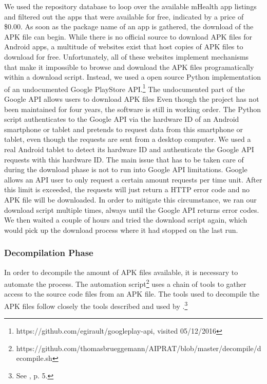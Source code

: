 We used the repository database to loop over the available mHealth app listings and filtered out the apps that were available for free, indicated by a price of \$0.00.
As soon as the package name of an app is gathered, the download of the APK file can begin. 
While there is no official source to download APK files for Android apps, a multitude of websites exist that host copies of APK files to download for free.
Unfortunately, all of these websites implement mechanisms that make it impossible to browse and download the APK files programatically within a download script.
Instead, we used a open source Python implementation of an undocumented Google PlayStore API.\footnote{https://github.com/egirault/googleplay-api, visited 05/12/2016} 
The undocumented part of the Google API allows users to download APK files 
Even though the project has not been maintained for four years, the software is still in working order.
The Python script authenticates to the Google API via the hardware ID of an Android smartphone or tablet and pretends to request data from this smartphone or tablet, even though the requests are sent from a desktop computer.
We used a real Android tablet to detect its hardware ID and authenticate the Google API requests with this hardware ID.
The main issue that has to be taken care of during the download phase is not to run into Google API limitations. 
Google allows an API user to only request a certain amount requests per time unit. 
After this limit is exceeded, the requests will just return a HTTP error code and no APK file will be downloaded.
In order to mitigate this circumstance, we ran our download script multiple times, always until the Google API returns error codes. 
We then waited a couple of hours and tried the download script again, which would pick up the download process where it had stopped on the last run.

\subsubsection{Decompilation Phase}

In order to decompile the amount of APK files available, it is necessary to automate the process. 
The automation script\footnote{https://github.com/thomasbrueggemann/AIPRAT/blob/master/decompile/decompile.sh} uses a chain of tools to gather access to the source code files from an APK file.
The tools used to decompile the APK files follow closely the tools described and used by \cite{Enck2011}.\footnote{See \cite{Enck2011}, p. 5.}

